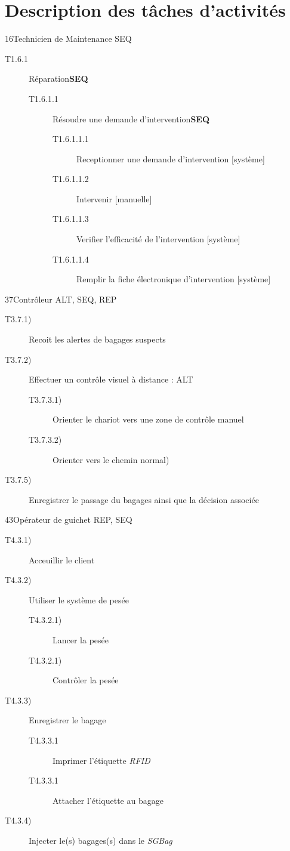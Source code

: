 \part{Description des tâches d'activités}

\dta
{1}{6}{Technicien de Maintenance}
{SEQ}
{
\begin{description}
	\item[T1.6.1] Réparation\textbf{SEQ}
	\begin{description}
		\item[T1.6.1.1] Résoudre une demande d'intervention\textbf{SEQ}
		\begin{description}
			\item[T1.6.1.1.1] Receptionner une demande d'intervention [système]
			\item[T1.6.1.1.2] Intervenir [manuelle]
			\item[T1.6.1.1.3] Verifier l'efficacité de l'intervention [système]
			\item[T1.6.1.1.4] Remplir la fiche électronique d'intervention [système]
		\end{description}
	\end{description}
\end{description}
}

\dta
{3}{7}{Contrôleur}
{ALT, SEQ, REP}
{
\begin{description}
	\item [T3.7.1)] Recoit les alertes de bagages suspects
	\item [T3.7.2)] Effectuer un contrôle visuel à distance : ALT
	\begin{description}
		\item [T3.7.3.1)] Orienter le chariot vers une zone de contrôle manuel
		\item [T3.7.3.2)] Orienter vers le chemin \og normal\fg)
	\end{description}
	\item [T3.7.5)] Enregistrer le passage du bagages ainsi que la décision associée	
\end{description}
}

\dta
{4}{3}{Opérateur de guichet}
{REP, SEQ}
{
\begin{description}
	\item [T4.3.1)] Acceuillir le client
	\item [T4.3.2)] Utiliser le système de pesée
	\begin{description}
		\item [T4.3.2.1)] Lancer la pesée
		\item [T4.3.2.1)] Contrôler la pesée
	\end{description}

	\item [T4.3.3)] Enregistrer le bagage
	\begin{description}
		\item [T4.3.3.1] Imprimer l'étiquette \textsl{RFID}
		\item [T4.3.3.1] Attacher l'étiquette au bagage
	\end{description}
		
	\item [T4.3.4)] Injecter le(s) bagages(s) dans le \textsl{SGBag} 
\end{description}
}

